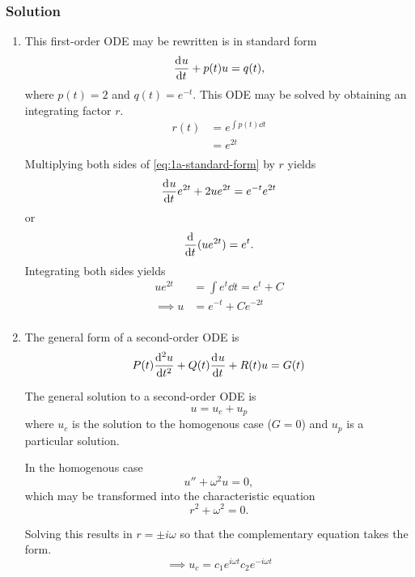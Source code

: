 \documentclass[12pt]{article}
\begin{document}
\subsubsection*{Solution}
\begin{enumerate}
\item This first-order ODE may be rewritten is in standard form
  \begin{equation}
    \label{eq:1a-standard-form}
    \od{u}{t} + p(t)u = q(t),
  \end{equation}
  where $p(t)=2$ and $q(t)=e^{-t}$. This ODE may be solved by obtaining an
  integrating factor $r$.
  \begin{equation*}
    \label{eq:1a-integrating-factor}
    \begin{aligned}
      r(t) &= e^{\int p(t) \dd{t}} \\
      &=e^{2t} \\
    \end{aligned}
  \end{equation*}
  Multiplying both sides of \cref{eq:1a-standard-form} by $r$ yields
  $$\od{u}{t} e^{2t} + 2u e^{2t} = e^{-t} e^{2t}$$
  or %
  $$\od{}{t}(u e^{2t}) = e^{t}.$$
  Integrating both sides yields
  \begin{equation} \boxed{
    \begin{aligned}
      u e^{2t} &= \int e^{t}\dd{t} = e^{t} + C \\
      \implies u &= e^{-t} + C e^{-2t} \\
    \end{aligned}
    }
  \end{equation}

\item The general form of a second-order ODE is
  $$P(t)\od[2]{u}{t} + Q(t)\od{u}{t} + R(t)u = G(t)$$

  The general solution to a second-order ODE is $$u = u_c + u_p$$ where $u_c$ is
  the solution to the homogenous case ($G=0$) and $u_p$ is a particular
  solution.

  In the homogenous case
  $$u''+\omega^2u=0,$$
  which may be transformed into the characteristic equation
  $$r^2+\omega^2=0.$$

  Solving this results in $r=\pm i\omega$ so that the complementary equation
  takes the form.
  \begin{equation}
    \label{eq:1n-hom-sol}
    \implies u_c = c_1e^{i\omega t}c_2e^{-i\omega t}
  \end{equation}


\end{enumerate}
\end{document}

